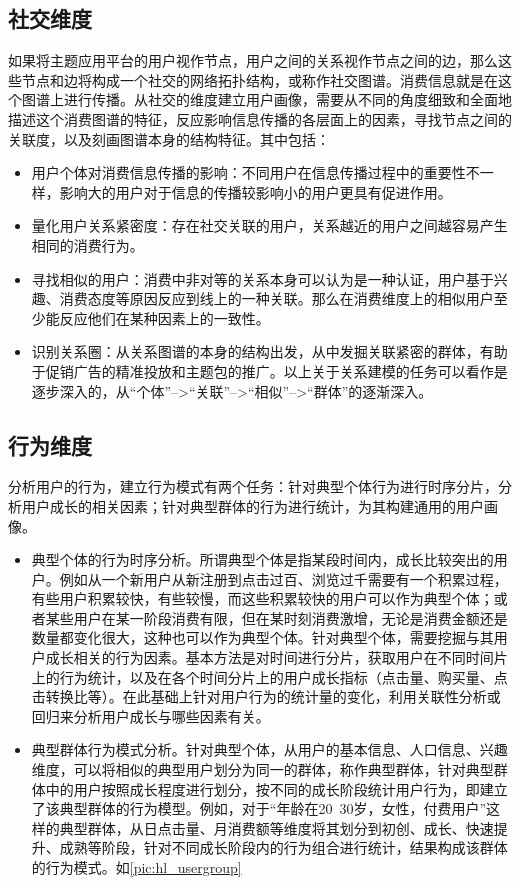         \subsection{社交维度}
        如果将主题应用平台的用户视作节点，用户之间的关系视作节点之间的边，那么这些节点和边将构成一个社交的网络拓扑结构，或称作社交图谱。消费信息就是在这个图谱上进行传播。从社交的维度建立用户画像，需要从不同的角度细致和全面地描述这个消费图谱的特征，反应影响信息传播的各层面上的因素，寻找节点之间的关联度，以及刻画图谱本身的结构特征。其中包括：
        \begin{itemize}
        \item 用户个体对消费信息传播的影响：不同用户在信息传播过程中的重要性不一样，影响大的用户对于信息的传播较影响小的用户更具有促进作用。
        \item 量化用户关系紧密度：存在社交关联的用户，关系越近的用户之间越容易产生相同的消费行为。
        \item 寻找相似的用户：消费中非对等的关系本身可以认为是一种认证，用户基于兴趣、消费态度等原因反应到线上的一种关联。那么在消费维度上的相似用户至少能反应他们在某种因素上的一致性。
        \item 识别关系圈：从关系图谱的本身的结构出发，从中发掘关联紧密的群体，有助于促销广告的精准投放和主题包的推广。以上关于关系建模的任务可以看作是逐步深入的，从“个体”-->“关联”-->“相似”-->“群体”的逐渐深入。
        \end{itemize}

        \subsection{行为维度}
        分析用户的行为，建立行为模式有两个任务：针对典型个体行为进行时序分片，分析用户成长的相关因素；针对典型群体的行为进行统计，为其构建通用的用户画像。
        \begin{itemize}
        \item 典型个体的行为时序分析。所谓典型个体是指某段时间内，成长比较突出的用户。例如从一个新用户从新注册到点击过百、浏览过千需要有一个积累过程，有些用户积累较快，有些较慢，而这些积累较快的用户可以作为典型个体；或者某些用户在某一阶段消费有限，但在某时刻消费激增，无论是消费金额还是数量都变化很大，这种也可以作为典型个体。针对典型个体，需要挖掘与其用户成长相关的行为因素。基本方法是对时间进行分片，获取用户在不同时间片上的行为统计，以及在各个时间分片上的用户成长指标（点击量、购买量、点击转换比等）。在此基础上针对用户行为的统计量的变化，利用关联性分析或回归来分析用户成长与哪些因素有关。
        \item 典型群体行为模式分析。针对典型个体，从用户的基本信息、人口信息、兴趣维度，可以将相似的典型用户划分为同一的群体，称作典型群体，针对典型群体中的用户按照成长程度进行划分，按不同的成长阶段统计用户行为，即建立了该典型群体的行为模型。例如，对于“年龄在20~30岁，女性，付费用户”这样的典型群体，从日点击量、月消费额等维度将其划分到初创、成长、快速提升、成熟等阶段，针对不同成长阶段内的行为组合进行统计，结果构成该群体的行为模式。如\autoref{pic:hl_usergroup}
        \end{itemize}

